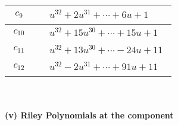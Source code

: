 \documentclass[1p]{elsarticle_modified}
\theoremstyle{definition}
\begin{document}
\begin{tabular}{m{50pt}|m{274pt}}
\hline $$\begin{aligned}c_{9}\end{aligned}$$&$\begin{aligned}
&u^{32}+2 u^{31}+\cdots+6 u+1
\end{aligned}$\\
\hline $$\begin{aligned}c_{10}\end{aligned}$$&$\begin{aligned}
&u^{32}+15 u^{30}+\cdots+15 u+1
\end{aligned}$\\
\hline $$\begin{aligned}c_{11}\end{aligned}$$&$\begin{aligned}
&u^{32}+13 u^{30}+\cdots-24 u+11
\end{aligned}$\\
\hline $$\begin{aligned}c_{12}\end{aligned}$$&$\begin{aligned}
&u^{32}-2 u^{31}+\cdots+91 u+11
\end{aligned}$\\
\hline
\end{tabular}\\~\\
\newpage\renewcommand{\arraystretch}{1}
\flushleft \textbf{(v) Riley Polynomials at the component}\newline \\
\end{document}
